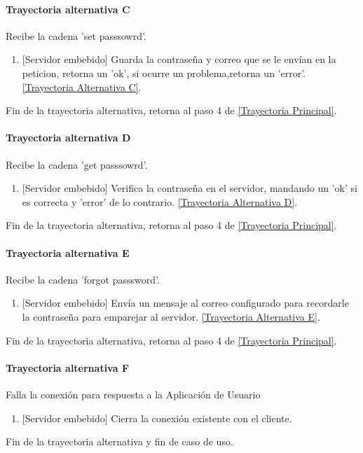 \paragraph{Trayectoria alternativa C} \label{SUB-M-CU1.4:TC}
	Recibe la cadena 'set passsowrd'.
	\begin{enumerate}[label=C\arabic*.]
		\item {[Servidor embebido]} Guarda la contraseña y correo que se le envían en la peticion, retorna un 'ok', si ocurre un problema,retorna un 'error'.
		\hyperref[SUB-M-CU1.4:TC]{[Trayectoria Alternativa C]}.
	\end{enumerate}
	Fin de la trayectoria alternativa, retorna al paso 4 de  \hyperref[SUB-M-CU1.4:TP]{[Trayectoria Principal]}.
	
\paragraph{Trayectoria alternativa D} \label{SUB-M-CU1.4:TD}
	Recibe la cadena 'get passsowrd'.
	\begin{enumerate}[label=D\arabic*.]
		\item {[Servidor embebido]} Verifica la contraseña en el servidor, mandando un 'ok' si es correcta y 'error' de lo contrario.
		\hyperref[SUB-M-CU1.4:TD]{[Trayectoria Alternativa D]}.
	\end{enumerate}
	Fin de la trayectoria alternativa, retorna al paso 4 de  \hyperref[SUB-M-CU1.4:TP]{[Trayectoria Principal]}.
	
\paragraph{Trayectoria alternativa E} \label{SUB-M-CU1.4:TE}
	Recibe la cadena 'forgot passsword'.
	\begin{enumerate}[label=E\arabic*.]
		\item {[Servidor embebido]} Envía un mensaje al correo configurado para recordarle la contraseña para emparejar al servidor.
		\hyperref[SUB-M-CU1.4:TE]{[Trayectoria Alternativa E]}.
	\end{enumerate}
	Fin de la trayectoria alternativa, retorna al paso 4 de  \hyperref[SUB-M-CU1.4:TP]{[Trayectoria Principal]}.
	
\paragraph{Trayectoria alternativa F} \label{SUB-M-CU1.4:TF}
	Falla la conexión para respuesta a la Aplicación de Usuario
	\begin{enumerate}[label=F\arabic*.]
		\item {[Servidor embebido]} Cierra la conexión existente con el cliente.
	\end{enumerate}
	Fin de la trayectoria alternativa y fin de caso de uso.
